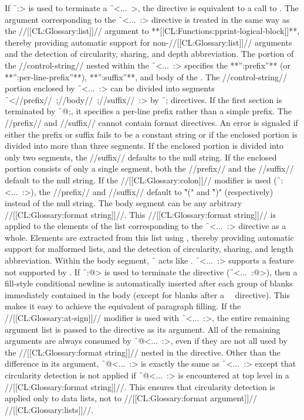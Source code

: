 If \f{~:>} is used to terminate a \f{~<...~>}, the directive is equivalent to a call to . The argument corresponding to the \f{~<...~:>} directive is treated in the same way as the //[[CL:Glossary:list]]// argument to **[[CL:Functions:pprint-logical-block]]**, thereby providing automatic support for non-//[[CL:Glossary:list]]// arguments and the detection of circularity, sharing, and depth abbreviation.   The portion of the //control-string// nested within the \f{~<...~:>} specifies the **'':prefix''** (or **'':per-line-prefix''**), **'':suffix''**, and body of the .
  The //control-string// portion enclosed by \f{~<...~:>} can be divided into segments \f{~<//prefix//~;//body//~;//suffix//~:>} by \f{~;} directives.  If the first section is terminated by \f{~@;},  it specifies a per-line prefix rather than a simple prefix.   The //prefix// and //suffix// cannot contain format directives.   An error is signaled if either the prefix or suffix fails to be a constant string or if the enclosed portion is divided into more than three segments.
  If the enclosed portion is divided into only two segments, the //suffix// defaults to the null string.  If the enclosed portion consists of only a single segment, both the //prefix// and the //suffix// default to  the null string.  If the //[[CL:Glossary:colon]]// modifier is used (\ie \f{~:<...~:>}), the //prefix// and //suffix// default to \f{"("} and \f{")"} (respectively) instead of the null string.
  The body segment can be any arbitrary //[[CL:Glossary:format string]]//. This //[[CL:Glossary:format string]]// is applied to the elements of the list corresponding to the \f{~<...~:>} directive as a whole. Elements are extracted from this list using , thereby providing automatic support for malformed lists, and the detection of circularity, sharing, and length abbreviation. Within the body segment, \f{~{\hat}} acts like .
  \f{~<...~:>} supports a feature not supported by . If \f{~:@>} is used to terminate the directive (\ie \f{~<...~:@>}),  then a fill-style conditional newline is automatically inserted after each group of blanks immediately contained in the body (except for blanks after a ~\NewlineChar\ directive).  This makes it easy to achieve the equivalent of paragraph filling.
  If the //[[CL:Glossary:at-sign]]// modifier is used with \f{~<...~:>}, the entire remaining argument list is passed to the directive as its argument.  All of the remaining arguments are always consumed by \f{~@<...~:>}, even if they are not all used by the //[[CL:Glossary:format string]]// nested in the directive.  Other than the difference in its argument, \f{~@<...~:>} is exactly the same as \f{~<...~:>} except that circularity detection is not applied if \f{~@<...~:>} is encountered at top level in a //[[CL:Glossary:format string]]//.  This ensures that circularity detection is applied only to data lists, not to //[[CL:Glossary:format argument]]// //[[CL:Glossary:lists]]//.

